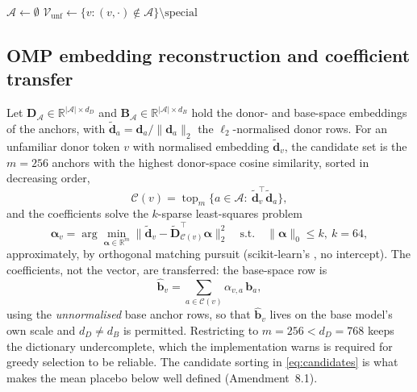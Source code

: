 \begin{algorithm}[!t]
\caption{Functional anchor identification ()}
\label{alg:anchors}
$\mathcal{A}\leftarrow\emptyset$\;
$\mathcal{V}_{\mathrm{unf}}\leftarrow\{v: (v,\cdot)\notin\mathcal{A}\}\setminus\mathrm{special}$\;
\end{algorithm}

\subsection{OMP embedding reconstruction and coefficient transfer}
\label{sec:method:omp}
Let $\mathbf{D}_{\mathcal{A}}\in\mathbb{R}^{|\mathcal{A}|\times d_D}$ and $\mathbf{B}_{\mathcal{A}}\in\mathbb{R}^{|\mathcal{A}|\times d_B}$ hold the donor- and base-space embeddings of the anchors, with $\tilde{\mathbf{d}}_a=\mathbf{d}_a/\|\mathbf{d}_a\|_2$ the $\ell_2$-normalised donor rows. For an unfamiliar donor token $v$ with normalised embedding $\tilde{\mathbf{d}}_v$, the candidate set is the $m=256$ anchors with the highest donor-space cosine similarity, sorted in decreasing order,
\begin{equation}
\mathcal{C}(v)=\operatorname{top}_{m}\big\{a\in\mathcal{A}:\ \tilde{\mathbf{d}}_v^{\top}\tilde{\mathbf{d}}_a\big\},
\label{eq:candidates}
\end{equation}
and the coefficients solve the $k$-sparse least-squares problem
\begin{equation}
\bm{\alpha}_v=\arg\min_{\bm{\alpha}\in\mathbb{R}^{m}}\big\|\tilde{\mathbf{d}}_v-\tilde{\mathbf{D}}_{\mathcal{C}(v)}^{\top}\bm{\alpha}\big\|_2^2\quad\text{s.t.}\quad\|\bm{\alpha}\|_0\le k,\ k=64,
\label{eq:omp}
\end{equation}
approximately, by orthogonal matching pursuit \cite{pati1993omp,tropp2007omp} (scikit-learn's , no intercept). The coefficients, not the vector, are transferred: the base-space row is
\begin{equation}
\hat{\mathbf{b}}_v=\sum_{a\in\mathcal{C}(v)}\alpha_{v,a}\,\mathbf{b}_a ,
\label{eq:transfer}
\end{equation}
using the \emph{unnormalised} base anchor rows, so that $\hat{\mathbf{b}}_v$ lives on the base model's own scale and $d_D\neq d_B$ is permitted. Restricting to $m=256<d_D=768$ keeps the dictionary undercomplete, which the implementation warns is required for greedy selection to be reliable. The candidate sorting in \eqref{eq:candidates} is what makes the mean placebo below well defined (Amendment~8.1).

